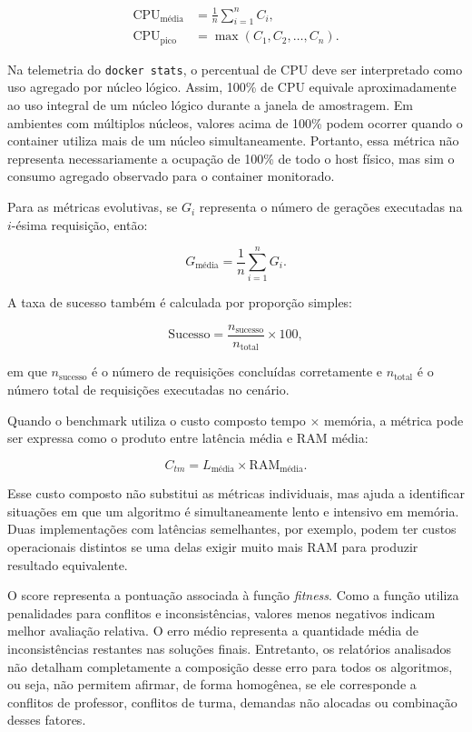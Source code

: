 \begin{align}
\text{CPU}_{\text{média}} &= \frac{1}{n}\sum_{i=1}^{n} C_i,\\
\text{CPU}_{\text{pico}} &= \max(C_1, C_2, \ldots, C_n).
\end{align}

Na telemetria do \texttt{docker stats}, o percentual de CPU deve ser interpretado como uso agregado por núcleo lógico. Assim, 100\% de CPU equivale aproximadamente ao uso integral de um núcleo lógico durante a janela de amostragem. Em ambientes com múltiplos núcleos, valores acima de 100\% podem ocorrer quando o container utiliza mais de um núcleo simultaneamente. Portanto, essa métrica não representa necessariamente a ocupação de 100\% de todo o host físico, mas sim o consumo agregado observado para o container monitorado.

Para as métricas evolutivas, se \(G_i\) representa o número de gerações executadas na \(i\)-ésima requisição, então:

\begin{equation}
G_{\text{média}} = \frac{1}{n}\sum_{i=1}^{n} G_i.
\end{equation}

A taxa de sucesso também é calculada por proporção simples:

\begin{equation}
\text{Sucesso} = \frac{n_{\text{sucesso}}}{n_{\text{total}}}\times 100,
\end{equation}

em que \(n_{\text{sucesso}}\) é o número de requisições concluídas corretamente e \(n_{\text{total}}\) é o número total de requisições executadas no cenário.

Quando o benchmark utiliza o custo composto tempo \(\times\) memória, a métrica pode ser expressa como o produto entre latência média e RAM média:

\begin{equation}
C_{tm} = L_{\text{média}}\times \text{RAM}_{\text{média}}.
\end{equation}

Esse custo composto não substitui as métricas individuais, mas ajuda a identificar situações em que um algoritmo é simultaneamente lento e intensivo em memória. Duas implementações com latências semelhantes, por exemplo, podem ter custos operacionais distintos se uma delas exigir muito mais RAM para produzir resultado equivalente.

O score representa a pontuação associada à função \textit{fitness}. Como a função utiliza penalidades para conflitos e inconsistências, valores menos negativos indicam melhor avaliação relativa. O erro médio representa a quantidade média de inconsistências restantes nas soluções finais. Entretanto, os relatórios analisados não detalham completamente a composição desse erro para todos os algoritmos, ou seja, não permitem afirmar, de forma homogênea, se ele corresponde a conflitos de professor, conflitos de turma, demandas não alocadas ou combinação desses fatores.

